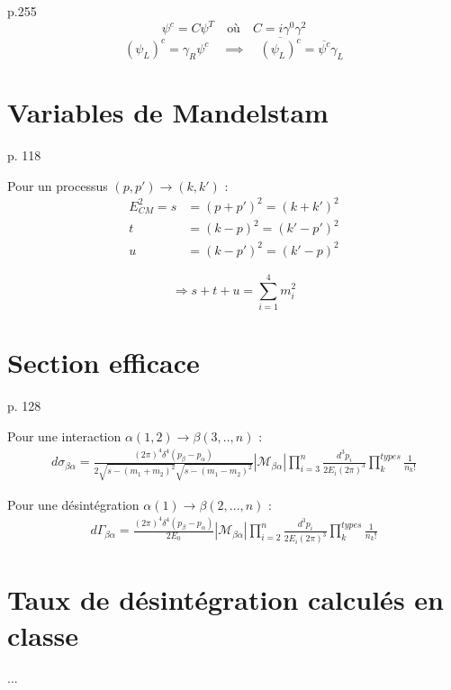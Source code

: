 \documentclass[12pt]{article}
\begin{document}
p.255 \\
\begin{equation}
  \psi^c = C\psi^T \quad \text{où} \quad C = i\gamma^0\gamma^2
\end{equation}
\begin{equation}
  (\psi_L)^c = \gamma_R\psi^c \quad \implies \quad \overline{(\psi_L)^c} = \overline{\psi^c}\gamma_L
\end{equation}

\section{Variables de Mandelstam}
p. 118

Pour un processus $(p, p') \rightarrow (k, k')$ :
\begin{align}
 E_{CM}^2 =  s &= (p + p')^2 = (k + k')^2 \\
  t &= (k - p)^2 = (k' - p')^2 \\
  u &= (k - p')^2 = (k' - p)^2 
\end{align}

\begin{equation}
  \Rightarrow s+t+u = \sum_{i=1}^4 m_i^2
\end{equation}

\section{Section efficace}
p. 128 

Pour une interaction $\alpha (1,2) \rightarrow \beta (3,.., n)$ :
\begin{align}
d\sigma_{\beta\alpha} = \frac{(2\pi)^4 \delta^{4}(p_\beta - p_\alpha)}{2 \sqrt{s - (m_1 + m_2)^2} \sqrt{s - (m_1 - m_2)^2}} |\mathcal{M_{\beta\alpha}}| \prod_{i=3}^n \frac{d^3p_i}{2E_i (2\pi)^3} \prod_{k}^{types} \frac{1}{n_k!}
\end{align}

Pour une désintégration $\alpha (1) \rightarrow \beta (2,..., n)$ :
\begin{align}
d\Gamma_{\beta\alpha} = \frac{(2\pi)^4 \delta^4 (p_\beta - p_\alpha)}{2E_0} |\mathcal{M_{\beta\alpha}}| \prod_{i=2}^n {\frac{d^3 p_i}{2 E_i (2\pi)^3}} \prod_{k}^{types} \frac{1}{n_k!}
\end{align}

\section{Taux de désintégration calculés en classe}
...
\end{document}
